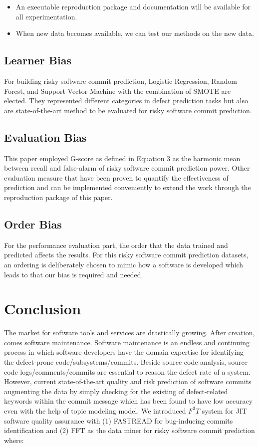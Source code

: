 \documentclass[sigconf,review, anonymous]{acmart}
\newcommand{\bi}{\begin{itemize}[leftmargin=0.4cm]}
\newcommand{\ei}{\end{itemize}}
\begin{document}
\bi
\item An executable reproduction package and documentation will be available for all experimentation. 
\item When new data becomes available, we can test our methods on the new data. 
\ei



\subsection{Learner Bias}

For building risky software commit prediction, Logistic Regression, Random Forest, and Support Vector Machine with the combination of SMOTE are elected. They represented different categories in defect prediction tasks but also are state-of-the-art method to be evaluated for risky software commit prediction. 

\subsection{Evaluation Bias}

This paper employed G-score as defined in Equation 3 as the harmonic mean between recall and false-alarm of risky software commit prediction power. Other evaluation measure that have been proven to quantify the effectiveness of prediction \cite{} and can be implemented conveniently to extend the work through the reproduction package of this paper.   

\subsection{Order Bias}

For the performance evaluation part, the order that the data trained and predicted affects the results.
For this risky software commit prediction datasets, an ordering is deliberately chosen to mimic how a software is developed which leads to that our bias is required and needed. 

\section{Conclusion}

The market for software tools and services are drastically growing. After creation, comes software maintenance. Software maintenance is an endless and continuing process in which software developers have the domain expertise for identifying the defect-prone code/subsystems/commits. Beside source code analysis, source code logs/comments/commits are essential to reason the defect rate of a system. However, current state-of-the-art quality and risk prediction of software commits augmenting the data by simply checking for the existing of defect-related keywords within the commit message which has been found to have low accuracy even with the help of topic modeling model. We introduced $F^3T$ system for JIT software quality assurance with (1) FASTREAD for bug-inducing commits identification and (2) FFT as the data miner for risky software commit prediction where:
\end{document}
